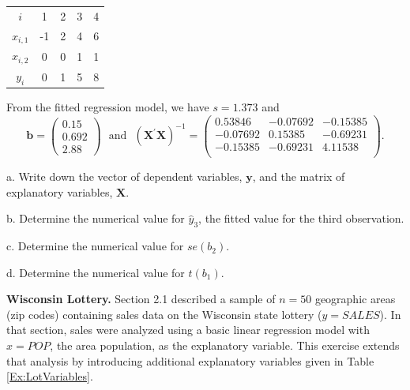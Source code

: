 \begin{exercises}
\begin{center}
\begin{tabular}{c|cccc}
\hline $i$ & 1 & 2 & 3 & 4 \\
$x_{i,1}$ & -1 & 2 & 4 & 6 \\
$x_{i,2}$ & 0 & 0 & 1 & 1 \\
$y_i$ & 0 & 1 & 5 & 8 \\
 \hline
\end{tabular}
\end{center}

\noindent From the fitted regression model, we have $s = 1.373$ and
\begin{equation*}
\mathbf{b} = \left(
\begin{array}{c}
0.15 \\ 0.692 \\2.88
\end{array}
\right) ~~~\mathrm{and}~~~ \left(\mathbf{X^{\prime} X} \right)^{-1}
= \left(
\begin{array}{cccc}
0.53846 & -0.07692 &-0.15385\\
-0.07692 & 0.15385 & -0.69231 \\
-0.15385 & -0.69231 & 4.11538 \\
\end{array}
\right).
\end{equation*}

a. Write down the vector of dependent variables, $\mathbf{y}$, and
the matrix of explanatory variables, $\mathbf{X}$.

b. Determine the numerical value for $\widehat{y}_3$, the fitted
value for the third observation.

c. Determine the numerical value for $se(b_2)$.

d. Determine the numerical value for $t(b_1)$.


\item \textbf{Wisconsin Lottery.}\label{Ex:Lottery3}
Section 2.1 described a sample of $n=50$ geographic areas (zip
codes) containing sales data on the Wisconsin state lottery ($y =
SALES$). In that section, sales were analyzed using a basic linear
regression model with $x = POP$, the area population, as the
explanatory variable. This exercise extends that analysis by
introducing additional explanatory variables given in Table
\ref{Ex:LotVariables}.



\end{exercises}
